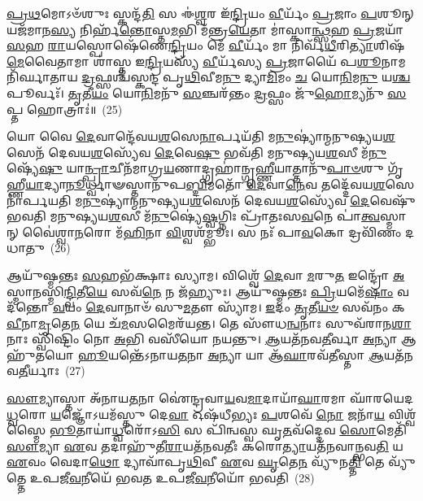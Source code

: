 \-\ul{𑌪𑍍𑌰}\-\-\ul{𑌥}\-𑌮𑍋\-𑌽𑍞᳴𑌶𑍁𑌃 𑌸𑍍𑌕𑌨𑍍𑌦᳴\-\ul{𑌤𑌿} 𑌸 𑌈॑\-\ul{𑌶𑍍𑌵}\-𑌰 𑌇᳴\-\ul{𑌨𑍍𑌦𑍍𑌰𑌿}\-𑌯𑌂 \ul{𑌵𑍀}\-𑌰𑍍𑌯𑌂᳴ \ul{𑌪𑍍𑌰}\-𑌜𑌾𑌂 \ul{𑌪}\-𑌶𑍂𑌨𑍍 𑌯𑌜᳴𑌮𑌾𑌨\-\ul{𑌸𑍍𑌯} 𑌨𑌿𑌰𑍍\mbox{}𑌹᳴\-\ul{𑌨𑍍𑌤𑍋}\-𑌸𑍍𑌤\-\ul{𑌮}\-𑌭𑌿 𑌮᳴𑌨𑍍𑌤𑍍𑌰\-\ul{𑌯𑍇}\-𑌤𑌾 𑌮𑌾॑𑌸𑍍𑌕𑌾\-\ul{𑌨𑍍𑌥𑍍𑌸}\-𑌹 \ul{𑌪𑍍𑌰}\-𑌜𑌯𑌾᳴ \ul{𑌸}\-𑌹 \ul{𑌰𑌾}\-𑌯𑌸𑍍𑌪𑍋𑌷𑍇᳴𑌣𑍇\-\ul{𑌨𑍍𑌦𑍍𑌰𑌿}\-𑌯𑌂 𑌮𑍇᳴ \ul{𑌵𑍀}\-𑌰𑍍𑌯𑌂᳴ 𑌮𑌾 𑌨𑌿𑌰𑍍𑌵᳴\-\ul{𑌧𑍀}\-𑌰𑌿\-\ul{𑌤𑍍𑌯𑌾}\-𑌶𑌿𑌷᳴\-\ul{𑌮𑍇}\-𑌵𑍈𑌤𑌾𑌮𑌾 𑌶𑌾॑𑌸𑍍𑌤 𑌇\-\ul{𑌨𑍍𑌦𑍍𑌰𑌿}\-𑌯𑌸𑍍𑌯᳴ \ul{𑌵𑍀}\-𑌰𑍍𑌯᳴𑌸𑍍𑌯 \ul{𑌪𑍍𑌰}\-𑌜𑌾𑌯𑍈᳴ 𑌪\-\ul{𑌶𑍂}\-𑌨𑌾𑌮𑌨𑌿᳴𑌰𑍍𑌘𑌾𑌤𑌾𑌯 \ul{𑌦𑍍𑌰}\-𑌫𑍍𑌸𑌶𑍍𑌚᳴𑌸𑍍𑌕𑌨𑍍𑌦 𑌪𑍃\-\ul{𑌥𑌿}\-𑌵𑍀𑌮\-\ul{𑌨𑍁} 𑌦𑍍𑌯𑌾\-\ul{𑌮𑌿}\-𑌮𑌂 \ul{𑌚} 𑌯𑍋\-\ul{𑌨𑌿}\-𑌮\-\ul{𑌨𑍁} 𑌯\-\ul{𑌶𑍍𑌚} 𑌪𑍂𑌰𑍍𑌵𑌃᳴। \ul{𑌤𑍃}\-𑌤𑍀\-\ul{𑌯𑌂} 𑌯𑍋\-\ul{𑌨𑌿}\-𑌮𑌨𑍁᳴ \ul{𑌸}\-𑌞𑍍𑌚𑌰᳴𑌨𑍍𑌤𑌂 \ul{𑌦𑍍𑌰}\-𑌫𑍍𑌸𑌂 𑌜𑍁᳴\-\ul{𑌹𑍋}\-𑌮𑍍𑌯𑌨𑍁᳴ \ul{𑌸}\-𑌪𑍍𑌤 𑌹𑍋𑌤𑍍𑌰𑌾𑌃॑॥~(25)

{\anuvakamend[{\-\ul{𑌤}\-𑌰𑍍𑌪𑌯᳴𑌤 𑌮𑌾\-𑌽𑌭𑌿\-\ul{𑌷𑍂}\-𑌯𑌮𑌾᳴𑌣\-\ul{𑌸𑍍𑌯} 𑌯\-\ul{𑌶𑍍𑌚} 𑌦𑌶᳴ 𑌚}]}%

𑌯𑍋 𑌵𑍈 \ul{𑌦𑍇}\-𑌵𑌾𑌨𑍍𑌦𑍇᳴𑌵𑌯\-\ul{𑌶}\-𑌸𑍇\-\ul{𑌨𑌾}\-𑌰𑍍𑌪𑌯᳴𑌤𑌿 𑌮\-\ul{𑌨𑍁}\-𑌷𑍍𑌯𑌾॑𑌨𑍍𑌮𑌨𑍁𑌷𑍍𑌯𑌯\-\ul{𑌶}\-𑌸𑍇𑌨᳴ 𑌦𑍇𑌵𑌯\-\ul{𑌶}\-𑌸𑍍𑌯𑍇᳴𑌵 \ul{𑌦𑍇}\-𑌵𑍇\-\ul{𑌷𑍁} 𑌭𑌵᳴𑌤𑌿 𑌮𑌨𑍁𑌷𑍍𑌯𑌯\-\ul{𑌶}\-𑌸𑍀 𑌮᳴\-\ul{𑌨𑍁}\-𑌷𑍍𑌯𑍇᳴\-\ul{𑌷𑍁} 𑌯𑌾\-\ul{𑌨𑍍𑌪𑍍𑌰𑌾}\-𑌚𑍀𑌨᳴𑌮𑌾𑌗𑍍𑌰\-\ul{𑌯}\-𑌣𑌾𑌦𑍍𑌗𑍍𑌰𑌹𑌾॑𑌨𑍍𑌗𑍃\-\ul{𑌹𑍍𑌣𑍀}\-𑌯𑌾𑌤𑍍𑌤𑌾𑌨𑍁᳴\-\ul{𑌪𑌾}\-\-\ul{𑍞}\-𑌶𑍁 𑌗𑍃᳴𑌹𑍍𑌣𑍀\-\ul{𑌯𑌾}\-𑌦𑍍𑌯𑌾\-\ul{𑌨𑍂}\-𑌰𑍍𑌧𑍍𑌵𑌾𑍟𑌸𑍍𑌤𑌾𑌨𑍁᳴𑌪\-\ul{𑌬𑍍𑌦𑌿}\-𑌮𑌤𑍋᳴ \ul{𑌦𑍇}\-𑌵𑌾\-\ul{𑌨𑍇}\-𑌵 𑌤𑌦𑍍𑌦𑍇᳴𑌵𑌯\-\ul{𑌶}\-𑌸𑍇𑌨𑌾॑𑌰𑍍𑌪𑌯𑌤𑌿 𑌮\-\ul{𑌨𑍁}\-𑌷𑍍𑌯𑌾॑𑌨𑍍𑌮𑌨𑍁𑌷𑍍𑌯𑌯\-\ul{𑌶}\-𑌸𑍇𑌨᳴ 𑌦𑍇𑌵𑌯\-\ul{𑌶}\-𑌸𑍍𑌯𑍇᳴𑌵 \ul{𑌦𑍇}\-𑌵𑍇𑌷𑍁᳴ 𑌭𑌵𑌤𑌿 𑌮𑌨𑍁𑌷𑍍𑌯𑌯\-\ul{𑌶}\-𑌸𑍀 𑌮᳴\-\ul{𑌨𑍁}\-𑌷𑍍𑌯𑍇॑\-\ul{𑌷𑍍𑌵}\-𑌗𑍍𑌨𑌿𑌃 𑌪𑍍𑌰𑌾᳴𑌤𑌃𑌸\-\ul{𑌵}\-𑌨𑍇 𑌪𑌾॑\-\ul{𑌤𑍍𑌵}\-𑌸𑍍𑌮𑌾𑌨𑍍 𑌵𑍈॑𑌶𑍍𑌵𑌾\-\ul{𑌨}\-𑌰𑍋 𑌮᳴\-\ul{𑌹𑌿}\-𑌨𑌾 \ul{𑌵𑌿}\-𑌶𑍍𑌵𑌶᳴𑌮𑍍𑌭𑍂𑌃। 𑌸 𑌨𑌃᳴ 𑌪𑌾\-\ul{𑌵}\-𑌕𑍋 𑌦𑍍𑌰𑌵𑌿᳴𑌣𑌂 𑌦𑌧𑌾𑌤𑍁~(26)

𑌆𑌯𑍁᳴𑌷𑍍𑌮𑌨𑍍𑌤𑌃 \ul{𑌸}\-𑌹𑌭᳴𑌕𑍍𑌷𑌾𑌃 𑌸𑍍𑌯𑌾𑌮। 𑌵𑌿𑌶𑍍𑌵𑍇᳴ \ul{𑌦𑍇}\-𑌵𑌾 \ul{𑌮}\-𑌰𑍁\-\ul{𑌤} 𑌇𑌨𑍍𑌦𑍍𑌰𑍋᳴ \ul{𑌅}\-𑌸𑍍𑌮𑌾\-\ul{𑌨}\-𑌸𑍍𑌮𑌿\-\ul{𑌨𑍍𑌦𑍍𑌵𑌿}\-𑌤𑍀\-\ul{𑌯𑍇} 𑌸𑌵᳴\-\ul{𑌨𑍇} 𑌨 𑌜᳴𑌹𑍍𑌯𑍁𑌃। 𑌆𑌯𑍁᳴𑌷𑍍𑌮𑌨𑍍𑌤𑌃 \ul{𑌪𑍍𑌰𑌿}\-𑌯𑌮𑍇᳴\-\ul{𑌷𑌾𑌂} 𑌵𑌦᳴𑌨𑍍𑌤𑍋 \ul{𑌵}\-𑌯𑌂 \ul{𑌦𑍇}\-𑌵𑌾𑌨𑌾𑍞᳴ 𑌸𑍁\-\ul{𑌮}\-𑌤𑍗 𑌸𑍍𑌯𑌾᳴𑌮। \ul{𑌇}\-𑌦𑌂 \ul{𑌤𑍃}\-𑌤𑍀\-\ul{𑌯}\-\-\ul{𑍞} 𑌸𑌵᳴𑌨𑌂 𑌕\-\ul{𑌵𑍀}\-𑌨𑌾\-\ul{𑌮𑍃}\-𑌤𑍇\-\ul{𑌨} 𑌯𑍇 𑌚᳴\-\ul{𑌮}\-𑌸𑌮𑍈𑌰᳴𑌯𑌨𑍍𑌤। 𑌤𑍇 𑌸𑍗᳴𑌧\-\ul{𑌨𑍍𑌵}\-𑌨𑌾𑌃 𑌸𑍁𑌵᳴𑌰𑌾𑌨\-\ul{𑌶𑌾}\-𑌨𑌾𑌃 𑌸𑍍𑌵𑌿᳴𑌷𑍍𑌟𑌿𑌂 𑌨𑍋 \ul{𑌅}\-𑌭𑌿 𑌵𑌸𑍀᳴𑌯𑍋 𑌨𑌯𑌨𑍍𑌤𑍁। \ul{𑌆}\-𑌯𑌤᳴𑌨𑌵\-\ul{𑌤𑍀}\-𑌰𑍍𑌵𑌾 \ul{𑌅}\-𑌨𑍍𑌯𑌾 𑌆𑌹𑍁᳴𑌤𑌯𑍋 \ul{𑌹𑍂}\-𑌯𑌨𑍍𑌤𑍇᳴\-𑌽𑌨𑌾𑌯\-\ul{𑌤}\-𑌨𑌾 \ul{𑌅}\-𑌨𑍍𑌯𑌾 𑌯𑌾 𑌆᳴\-\ul{𑌘𑌾}\-𑌰𑌵᳴\-\ul{𑌤𑍀}\-𑌸𑍍𑌤𑌾 \ul{𑌆}\-𑌯𑌤᳴𑌨𑌵\-\ul{𑌤𑍀}\-𑌰𑍍𑌯𑌾𑌃~(27)

\-\ul{𑌸𑍗}\-𑌮𑍍𑌯𑌾𑌸𑍍𑌤𑌾 𑌅᳴𑌨𑌾𑌯\-\ul{𑌤}\-𑌨𑌾 𑌐॑𑌨𑍍𑌦𑍍𑌰𑌵𑌾\-\ul{𑌯}\-𑌵\-\ul{𑌮𑌾}\-𑌦𑌾𑌯𑌾᳴\-\ul{𑌘𑌾}\-𑌰𑌮𑌾 𑌘𑌾᳴𑌰𑌯𑍇𑌦\-\ul{𑌧𑍍𑌵}\-𑌰𑍋 \ul{𑌯}\-𑌜𑍍𑌞𑍋᳴\-𑌽𑌯𑌮᳴𑌸𑍍𑌤𑍁 𑌦𑍇\-\ul{𑌵𑌾} 𑌓𑌷᳴𑌧𑍀𑌭𑍍𑌯𑌃 \ul{𑌪}\-𑌶𑌵𑍇᳴ \ul{𑌨𑍋} 𑌜𑌨𑌾᳴\-\ul{𑌯} 𑌵𑌿𑌶𑍍𑌵᳴𑌸𑍍𑌮𑍈 \ul{𑌭𑍂}\-𑌤𑌾𑌯𑌾॑\-\ul{𑌧𑍍𑌵}\-𑌰𑍋᳴\-𑌽\-\ul{𑌸𑌿} 𑌸 𑌪𑌿᳴𑌨𑍍𑌵𑌸𑍍𑌵 𑌘𑍃\-\ul{𑌤}\-𑌵᳴𑌦𑍍𑌦𑍇𑌵 \ul{𑌸𑍋}\-𑌮𑍇𑌤𑌿᳴ \ul{𑌸𑍗}\-𑌮𑍍𑌯𑌾 \ul{𑌏}\-𑌵 𑌤𑌦𑌾𑌹𑍁᳴𑌤𑍀\-\ul{𑌰𑌾}\-𑌯𑌤᳴𑌨𑌵𑌤𑍀𑌃 𑌕𑌰𑍋\-\ul{𑌤𑍍𑌯𑌾}\-𑌯𑌤᳴𑌨𑌵𑌾𑌨𑍍𑌭𑌵\-\ul{𑌤𑌿} 𑌯 \ul{𑌏}\-𑌵𑌂 𑌵𑍇𑌦𑌾\-\ul{𑌥𑍋} 𑌦𑍍𑌯𑌾𑌵𑌾᳴𑌪𑍃\-\ul{𑌥𑌿}\-𑌵𑍀 \ul{𑌏}\-𑌵 \ul{𑌘𑍃}\-𑌤𑍇\-\ul{𑌨} 𑌵𑍍𑌯𑍁᳴𑌨\-\ul{𑌤𑍍𑌤𑌿} 𑌤𑍇 𑌵𑍍𑌯𑍁᳴𑌤𑍍𑌤𑍇 𑌉𑌪𑌜𑍀\-\ul{𑌵}\-𑌨𑍀𑌯𑍇᳴ 𑌭𑌵𑌤 𑌉𑌪𑌜𑍀\-\ul{𑌵}\-𑌨𑍀𑌯𑍋᳴ 𑌭𑌵𑌤𑌿~(28)

